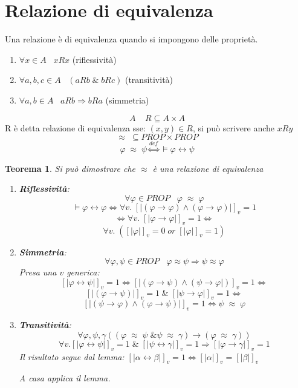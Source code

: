 \documentclass{article}
\newtheorem{theorem}{Teorema}
\theoremstyle{break}
\theoremstyle{break}
\theoremstyle{break}
\theoremstyle{break}
\begin{document}
\section{Relazione di equivalenza}
Una relazione è di equivalenza quando si impongono delle proprietà.
\begin{enumerate}
    \item \( \forall x \in A\;\;\; xRx \) (riflessività)
    \item \( \forall a,b,c \in A\;\;\; (aRb\;\&\;bRc) \) (transitività)
    \item \( \forall a,b \in A\;\;\; aRb  \Rightarrow bRa \) (simmetria)
\end{enumerate}
\[
A\;\;\;\; R \subseteq A \times A
\] 
R è detta relazione di equivalenza sse: \( (x,y) \in R \), si può scrivere anche \( xRy \)  
\[
\approx \; \subseteq PROP \times PROP
\] 
\[
    \varphi\;\approx\;\psi \stackrel{def}{\Leftrightarrow} \models \varphi \leftrightarrow \psi
\] 
\begin{theorem}
    Si può dimostrare che \( \approx \) è una relazione di equivalenza
    \begin{enumerate}
        \item \textbf{Riflessività}: \[
                \forall \varphi \in PROP \;\;\; \varphi\; \approx \; \varphi \] 
            \[
                \models \varphi \leftrightarrow \varphi \Leftrightarrow \forall v.\; [|(\varphi \to \varphi) \wedge (\varphi \to \varphi)|]_v = 1
            \]\[
            \Leftrightarrow \forall v.\; [|\varphi \to \varphi|]_v = 1 \Leftrightarrow
            \]  
            \[
                \forall v.\; ([|\varphi|]_v=0\; or\; [|\varphi|]_v=1)
            \] 
       \item \textbf{Simmetria}: \[
       \forall \varphi,\psi \in  PROP\;\;\; \varphi \approx \psi \Rightarrow \psi \approx \varphi
       \] 
       Presa una \( v \) generica:
       \[
           [|\varphi \leftrightarrow \psi|]_v = 1 \Leftrightarrow [|(\varphi \to \psi) \wedge (\psi \to \varphi|)]_v=1 \Leftrightarrow 
       \] 
       \[
           [|(\varphi \to  \psi)|]_v=1\; \&\; [|\psi \to \varphi|]_v=1 \Leftrightarrow
       \] 
        \[
        [|(\psi \to \varphi) \wedge (\varphi \to \psi)|]_v=1 \Leftrightarrow \psi\; \approx\; \varphi
        \] 

        \item \textbf{Transitività}: \[
                \forall \varphi,\psi,\gamma ((\varphi\; \approx\; \psi\; \& \psi\; \approx\; \gamma) \to (\varphi\; \approx\; \gamma)) 
        \] 
        \[
            \forall v. [|\varphi \leftrightarrow \psi|]_v=1 \;\&\; [|\psi \leftrightarrow \gamma|]_v=1 \Rightarrow [|\varphi \to \gamma|]_v=1
        \] 
        Il risultato segue dal lemma: \( [|\alpha \leftrightarrow \beta|]_v=1 \Leftrightarrow [|\alpha|]_v=[|\beta|]_v \) 
        
        A casa applica il lemma.
    \end{enumerate}
\end{theorem}
\end{document}

